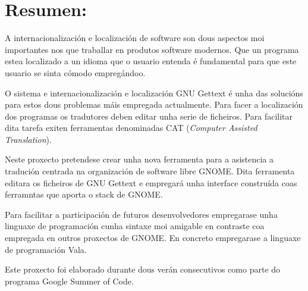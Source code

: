 %
%

\section*{Resumen:}

A internacionalización e localización de software son dous aspectos moi importantes nos que traballar en produtos software modernos. Que un programa estea localizado a un idioma que o usuario entenda é fundamental para que este usuario se sinta cómodo empregándoo.

O sistema e internacionalización e localización GNU Gettext é unha das solucións para estos dous problemas máis empregada actualmente. Para facer a localización dos programas os tradutores deben editar unha serie de ficheiros. Para facilitar dita tarefa exiten ferramentas denominadas CAT (\emph{Computer Assisted Translation}).

Neste proxecto pretendese crear unha nova ferramenta para a asistencia a tradución centrada na organización de software libre GNOME. Dita ferramenta editara os ficheiros de GNU Gettext e empregará unha interface construída coas ferramntas que aporta o stack de GNOME.

Para facilitar a participación de futuros desenvolvedores empregarase unha linguaxe de programación cunha sintaxe moi amigable en contraste coa empregada en outros proxectos de GNOME. En concreto empregarase a linguaxe de programación Vala.

Este proxecto foi elaborado durante dous verán consecutivos como parte do programa Google Summer of Code.
